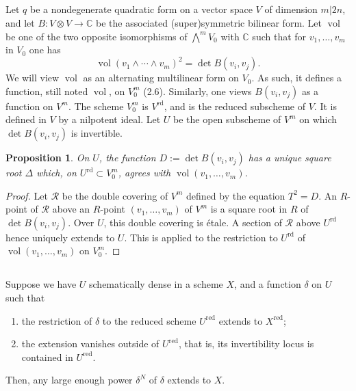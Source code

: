\documentclass[11pt,a4paper]{article}
\theoremstyle{plain}
\newtheorem{proposition}[theorem]{Proposition}
\theoremstyle{definition}
\DeclareMathOperator{\vol}{vol}
\newcommand{\C}{\mathbb{C}}
\begin{document}
\subsection{}
Let $q$ be a nondegenerate quadratic form on a vector space $V$ of dimension $m|2n$, and let $B : V \otimes V \to \C$ be the associated (super)symmetric bilinear form. Let $\vol$ be one of the two opposite isomorphisms of $\bigwedge^m V_0$ with $\C$ such that for $v_1,\dots,v_m$ in $V_0$ one has
\begin{equation}\label{eq:5.1.1}
\vol(v_1 \wedge \cdots \wedge v_m)^2 = \det B(v_i, v_j).
\end{equation}
We will view $\vol$ as an alternating multilinear form on $V_0$. As such, it defines a function, still noted $\vol$, on $V_0^m$ (2.6). Similarly, one views $B(v_i, v_j)$ as a function on $V^m$. The scheme $V_0^m$ is $V^{\mathrm{rd}}$, and is the reduced subscheme of $V$. It is defined in $V$ by a nilpotent ideal. Let $U$ be the open subscheme of $V^m$ on which $\det B(v_i, v_j)$ is invertible.

\begin{proposition}\label{prop:5.2}
On $U$, the function $D := \det B(v_i, v_j)$ has a unique square root $\Delta$ which, on $U^{\mathrm{rd}} \subset V_0^m$, agrees with $\vol(v_1,\dots,v_m)$.
\end{proposition}

\begin{proof}
Let $\mathcal{R}$ be the double covering of $V^m$ defined by the equation $T^2 = D$. An $R$-point of $\mathcal{R}$ above an $R$-point $(v_1,\dots,v_m)$ of $V^m$ is a square root in $R$ of $\det B(v_i, v_j)$. Over $U$, this double covering is \'etale. A section of $\mathcal{R}$ above $U^{\mathrm{rd}}$ hence uniquely extends to $U$. This is applied to the restriction to $U^{\mathrm{rd}}$ of $\vol(v_1,\dots,v_m)$ on $V_0^m$.
\end{proof}

\subsection{}
Suppose we have $U$ schematically dense in a scheme $X$, and a function $\delta$ on $U$ such that
\begin{enumerate}[label=\alph*)]
\item the restriction of $\delta$ to the reduced scheme $U^{\mathrm{red}}$ extends to $X^{\mathrm{red}}$;
\item the extension vanishes outside of $U^{\mathrm{red}}$, that is, its invertibility locus is contained in $U^{\mathrm{red}}$.
\end{enumerate}
Then, any large enough power $\delta^N$ of $\delta$ extends to $X$.
\end{document}
